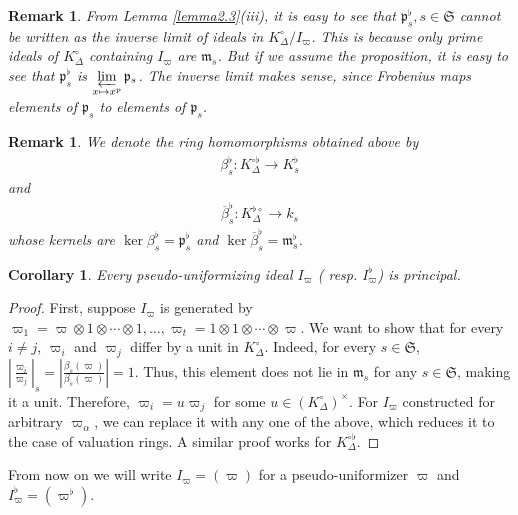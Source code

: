 \documentclass[12pts,a4paper]{amsart}
\newtheorem{remark}[proposition]{Remark}
\newtheorem{corollary}[proposition]{Corollary}
\begin{document}
\begin{remark}
    From Lemma \ref{lemma2.3}(iii), it is easy to see that $\mathfrak{p}^\flat_s, s\in\mathfrak{S}$ cannot be written as the inverse limit of ideals in $K^\circ_\Delta/I_\varpi$. This is because only prime ideals of $K^\circ_\Delta$ containing $I_\varpi$ are $\mathfrak{m}_s$. But if we assume the proposition, it is easy to see that $\mathfrak{p}^\flat_s$ is $\varprojlim\limits_{x\mapsto x^p}\mathfrak{p}_s$. The inverse limit makes sense, since Frobenius maps elements of $\mathfrak{p}_s$ to elements of $\mathfrak{p}_s$.
\end{remark}

\begin{remark}
	We denote the ring homomorphisms obtained above by
	\begin{align*}
		\beta^\flat_s: K^{\circ\flat}_\Delta\to K^\flat_s
	\end{align*}
	and 
	\begin{align*}
		\overline{\beta}^\flat_s: K^{\flat\circ}_\Delta\to k_s
	\end{align*}
	whose kernels are $\ker\beta^\flat_s=\mathfrak{p}^\flat_s$ and $\ker\overline{\beta}^\flat_s=\mathfrak{m}^\flat_s$. 
\end{remark}


\begin{corollary}
    Every pseudo-uniformizing ideal $I_\varpi$ ( resp. $I^\flat_\varpi$) is principal.
\end{corollary}

\begin{proof}
   First, suppose $I_\varpi$ is generated by $\varpi_1=\varpi\otimes1\otimes\cdots\otimes 1,\ldots,\varpi_t=1\otimes 1\otimes\cdots \otimes \varpi$. We want to show that for every $i\neq j$, $\varpi_i$ and $\varpi_j$ differ by a unit in $K^\circ_\Delta$. Indeed, for every $s\in \mathfrak{S}$, $\left|\frac{\varpi_i}{\varpi_j}\right|_s=\left|\frac{\beta_s(\varpi)}{\beta_s(\varpi)}\right|=1$. Thus, this element does not lie in $\mathfrak{m}_s$ for any $s\in\mathfrak{S}$, making it a unit. Therefore, $\varpi_i=u\varpi_j$ for some $u\in (K^\circ_\Delta)^\times$. For $I_\varpi$ constructed for arbitrary $\varpi_\alpha$, we can replace it with any one of the above, which reduces it to the case of valuation rings. A similar proof works for $K^{\circ\flat}_\Delta$.
\end{proof}

From now on we will write $I_\varpi=(\varpi)$ for a pseudo-uniformizer $\varpi$ and $I^\flat_\varpi=(\varpi^\flat)$.
\end{document}
